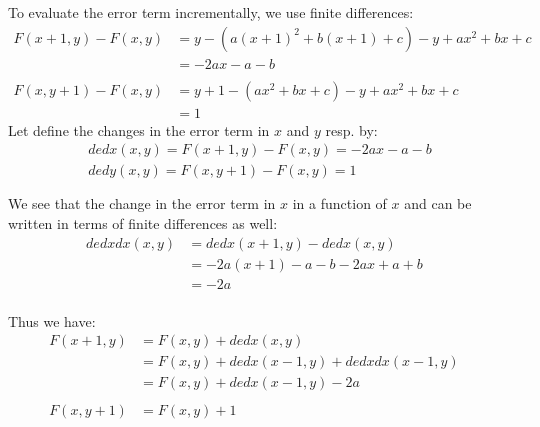 \documentclass[a4paper,10pt]{article}
\begin{document}
\bigskip \noindent
To evaluate the error term incrementally, we use finite differences:
\begin{equation}
\left.\begin{aligned}
	F(x + 1, y) - F(x, y) 
	&= y - (a(x + 1)^2 + b(x + 1) + c) - y + ax^2 + bx + c& \\
	&= -2ax - a - b& \\\\
	F(x, y + 1) - F(x, y) 
	&= y + 1 - (ax^2 + bx + c) - y + ax^2 + bx + c& \\
	&= 1&
\end{aligned}\right.
\end{equation}
\newpage \noindent
Let define the changes in the error term in $x$ and $y$ resp. by:
\begin{equation}
\left.\begin{aligned}
	&dedx(x, y) = F(x + 1, y) - F(x, y) = -2ax - a - b& \\	
	&dedy(x, y) = F(x, y + 1) - F(x, y) = 1& \\\\
\end{aligned}\right.
\end{equation}
We see that the change in the error term in $x$ in a function of $x$ and can be written in terms of finite differences as well:
\begin{equation}
\left.\begin{aligned}
	dedxdx(x, y) &= dedx(x + 1, y) - dedx(x, y)& \\
				 &= -2a(x + 1) - a - b - 2ax + a + b& \\
				 &= -2a&\\
\end{aligned}\right.
\end{equation}

\noindent
Thus we have:
\begin{equation}
\left.\begin{aligned}
	F(x + 1, y) &= F(x, y) + dedx(x, y)&\\
				&= F(x, y) + dedx(x - 1, y) + dedxdx(x - 1, y)& \\
				&= F(x, y) + dedx(x - 1, y) - 2a& \\\\
	F(x, y + 1) &= F(x, y) + 1& \\\\
\end{aligned}\right.
\end{equation}
\end{document}
